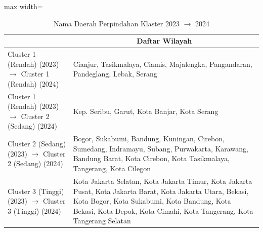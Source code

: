\begin{table}[H]
\centering
\caption{Nama Daerah Perpindahan Klaster 2023 \(\rightarrow\) 2024} \label{tab:app1transname2023x2024}
\begin{adjustbox}{max width=\textwidth}
\begin{tabular}{|>{\centering\arraybackslash}p{4cm}|p{10cm}|}
\hline
\multicolumn{1}{|c|}{\textbf{Kategori}} & \multicolumn{1}{c|}{\textbf{Daftar Wilayah}} \\
\hline
Cluster 1 (Rendah) (2023) \(\rightarrow\) Cluster 1 (Rendah) (2024) & Cianjur, Tasikmalaya, Ciamis, Majalengka, Pangandaran, Pandeglang, Lebak, Serang \\
\hline
Cluster 1 (Rendah) (2023) \(\rightarrow\) Cluster 2 (Sedang) (2024) & Kep. Seribu, Garut, Kota Banjar, Kota Serang \\
\hline
Cluster 2 (Sedang) (2023) \(\rightarrow\) Cluster 2 (Sedang) (2024) & Bogor, Sukabumi, Bandung, Kuningan, Cirebon, Sumedang, Indramayu, Subang, Purwakarta, Karawang, Bandung Barat, Kota Cirebon, Kota Tasikmalaya, Tangerang, Kota Cilegon \\
\hline
Cluster 3 (Tinggi) (2023) \(\rightarrow\) Cluster 3 (Tinggi) (2024) & Kota Jakarta Selatan, Kota Jakarta Timur, Kota Jakarta Pusat, Kota Jakarta Barat, Kota Jakarta Utara, Bekasi, Kota Bogor, Kota Sukabumi, Kota Bandung, Kota Bekasi, Kota Depok, Kota Cimahi, Kota Tangerang, Kota Tangerang Selatan \\
\hline
\end{tabular}
\end{adjustbox}
\end{table}